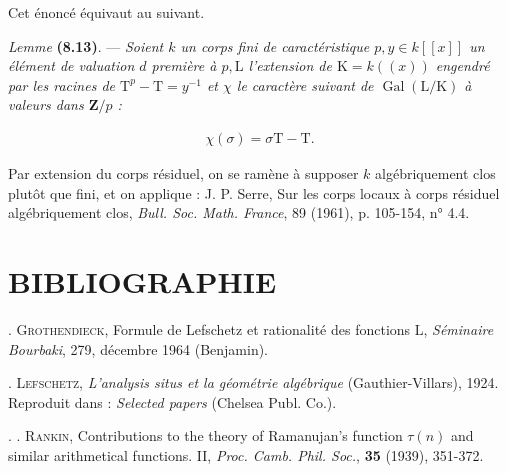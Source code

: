 \documentclass[10pt,leqno]{article}
\begin{document}
\noindent Cet énoncé équivaut au suivant.\par

\noindent \emph{Lemme} \textbf{(8.13)}. — {\itshape Soient \(k\) un corps fini de caractéristique \(p, y \in  k[[x]]\) un élément de valuation \(d\) première à \(p, \mathrm{L}\) l'extension de \(\mathrm{K} = k((x))\) engendré par les racines de \(\mathrm{T}^{p}-\mathrm{T} = y^{-1}\) et \(\chi \) le caractère suivant de \(\operatorname{Gal}(\mathrm{L}/\mathrm{K})\) à valeurs dans \(\mathbf{Z}/p\) :}\par

\begin{equation*}\begin{gathered}\chi (\sigma ) = \sigma \mathrm{T}-\mathrm{T}.\end{gathered}\end{equation*}

\par

\noindent Par extension du corps résiduel, on se ramène à supposer \(k\) algébriquement clos plutôt que fini, et on applique : J. P. Serre, Sur les corps locaux à corps résiduel algébriquement clos, \emph{Bull. Soc. Math. France}, 89 (1961), p. 105-154, n° 4.4.\par

\section*{BIBLIOGRAPHIE}

\noindent [\(1] \). \textsc{Grothendieck}, Formule de Lefschetz et rationalité des fonctions \(\mathrm{L}\), \emph{Séminaire Bourbaki}, 279, décembre 1964 (Benjamin).\par

\noindent [\(2] \). \textsc{Lefschetz}, \emph{L'analysis situs et la géométrie algébrique} (Gauthier-Villars), 1924. Reproduit dans : \emph{Selected papers} (Chelsea Publ. Co.).\par

\noindent [\(3] . \). \textsc{Rankin}, Contributions to the theory of Ramanujan's function \(\tau (n)\) and similar arithmetical functions. II, \emph{Proc. Camb. Phil. Soc.}, \textbf{35} (1939), 351-372.\par

\clearpage

\label{physical-36}\par\smallskip
\end{document}
